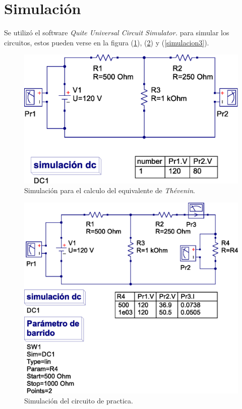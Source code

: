 \documentclass[letter,11pt]{article}
\begin{document}
\section{Simulación}
Se utilizó el software \emph{Quite Universal Circuit Simulator.} para simular
los circuitos, estos pueden verse en la figura (\ref{simulacion1}),
(\ref{simulacion2}) y (\ref{simulacion3}).

\begin{figure}[!h]
\centering
\includegraphics[scale=0.52]{simulation/practica4.1.eps}
\caption{Simulación para el calculo del equivalente de \emph{Thévenin}.}
\label{simulacion1}
\end{figure}

\begin{figure}[!h]
\centering
\includegraphics[scale=0.60]{simulation/practica4.2.eps}
\caption{Simulación del circuito de practica.}
\label{simulacion2}
\end{figure}
\end{document}
